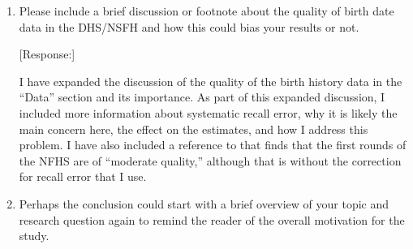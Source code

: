 \documentclass[letterpaper,12pt]{article}
\begin{document}
\begin{enumerate}
[Response:]

I now define spell as the unit of analysis---the period from one parity birth to 
the following birth or censoring---when I first use the word in the ``Estimation 
Strategy'' section.
Furthermore, I clarify that for estimation purposes, spells begin nine months 
after the previous birth since this is the earliest we should expect to observe 
a new birth.

To make comparisons with both the NFHS reports and the prior literature on
birth spacing easier and avoid confusion, I have rewritten the discussions of 
spacing and redone the graphs and table, so all results now reflect birth 
intervals in months.
I still retain the use of ``spell'' to indicate a generic period from one parity 
birth to another---i.e.,the second spell is from first birth to the second birth or
censoring---in the graphs/tables.


In the Data section, I have also changed the discussion of the imposed censoring 
clearer by specifying the cut-offs for both the spell duration and the birth interval.
In the ``Estimation Strategy'' section, I explain that I add nine months
to the estimated spell length to get to birth intervals.
In the ``Mortality and the Changing Birth Spacing'' section, I retained the
definition of the periods but updated the numbers and the discussion of
results. 
Hence, they now reflect birth intervals rather than pregnancy intervals.



\item Please include a brief discussion or footnote about the quality of
birth date data in the DHS/NSFH and how this could bias your results or
not.

[Response:]

I have expanded the discussion of the quality of the birth history data in the ``Data'' 
section and its importance. 
As part of this expanded discussion, I included more information about systematic recall error, why it is likely the main concern here, the effect on the estimates, and how I address this problem.
I have also included a reference to \citet{Schoumaker2014} that finds that the first
rounds of the NFHS are of ``moderate quality,'' although that is without the correction
for recall error that I use.


\item Perhaps the conclusion could start with a brief overview of your
topic and research question again to remind the reader of the overall
motivation for the study.


\end{enumerate}
\end{document}
